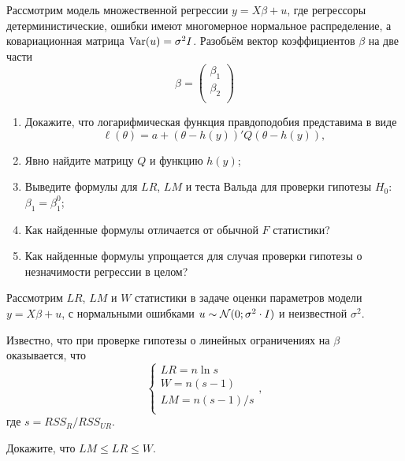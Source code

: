 \begin{problem}
  Рассмотрим модель множественной регрессии $y = X\beta + u$, где регрессоры детерминистические,
  ошибки имеют многомерное нормальное распределение,
  а ковариационная матрица $\operatorname{Var}(u)=\sigma^2 I$. Разобьём вектор коэффициентов $\beta$ на две части
  \[
    \beta = \begin{pmatrix}
      \beta_1 \\
      \beta_2 \\
    \end{pmatrix}
  \]

  \begin{enumerate}
    \item Докажите, что логарифмическая функция правдоподобия представима в виде
\[
     \ell(\theta) = a + (\theta - h(y))' Q (\theta - h(y)),
  \]
\item Явно найдите матрицу $Q$ и функцию $h(y)$;
\item Выведите формулы для $LR$, $LM$ и теста Вальда для проверки гипотезы $H_0$: $\beta_1 = \beta_1^0$;
\item Как найденные формулы отличается от обычной $F$ статистики?
\item Как найденные формулы упрощается для случая проверки гипотезы о незначимости регрессии в целом?
  \end{enumerate}

  \begin{sol}
  \end{sol}
\end{problem}


\begin{problem}
Рассмотрим $LR$, $LM$ и $W$ статистики в задаче оценки параметров модели $y=X\beta + u$, с нормальными ошибками $u\sim \mathcal{N}(0;\sigma^2 \cdot I)$ и неизвестной $\sigma^2$.

Известно, что при проверке гипотезы о линейных ограничениях на $\beta$ оказывается, что
\[
\begin{cases}
   LR = n \ln s \\
   W = n (s - 1) \\
   LM = n(s-1)/s \\
\end{cases},
\]
где $s = RSS_R / RSS_{UR}$.

Докажите, что $LM \leq LR \leq W$.
  \begin{sol}
  \end{sol}
\end{problem}


